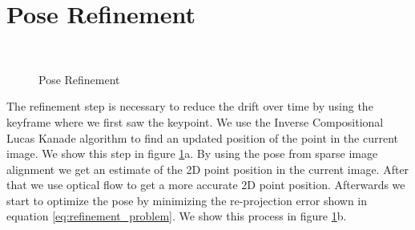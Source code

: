 \documentclass[11pt,a4paper,titlepage,oneside]{report}
\begin{document}
\section{Pose Refinement}\label{sec:refinement}
\begin{figure}[H]
  \centering
  \\
  \caption{Pose Refinement}\label{fig:pose_refinement}
\end{figure}

The refinement step is necessary to reduce the drift over time by using the keyframe where we first saw the keypoint. We use the Inverse Compositional Lucas Kanade algorithm to find an updated position of the point in the current image. We show this step in figure \ref{fig:pose_refinement}a. By using the pose from sparse image alignment we get an estimate of the 2D point position in the current image. After that we use optical flow to get a more accurate 2D point position. Afterwards we start to optimize the pose by minimizing the re-projection error shown in equation \ref{eq:refinement_problem}. We show this process in figure \ref{fig:pose_refinement}b.
\end{document}
